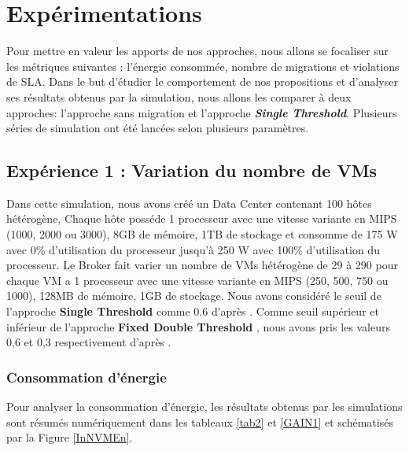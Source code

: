 \section{Expérimentations}

\begin{onehalfspace}
Pour mettre en valeur les apports de nos approches, nous allons se focaliser sur les métriques suivantes : l’énergie consommée, nombre de migrations et violations de SLA. Dans le but d’étudier le comportement de nos propositions et d’analyser ses résultats obtenus par la simulation, nous allons les comparer à deux approches: l’approche sans migration et l’approche \textit{\textbf{Single Threshold}}. Plusieurs séries de simulation ont été lancées selon plusieurs paramètres.

\subsection{Expérience 1 : Variation du nombre de VMs}
Dans cette simulation, nous avons créé un Data Center contenant 100 hôtes hétérogène, Chaque hôte posséde 1 processeur avec une vitesse variante en MIPS (1000, 2000 ou 3000), 8GB de mémoire, 1TB de stockage et consomme de 175 W avec 0\% d'utilisation du processeur jusqu'à 250 W avec 100\% d'utilisation du processeur. Le Broker fait varier un nombre de VMs hétérogène de 29 à 290 pour chaque VM a 1 processeur avec une vitesse variante en MIPS (250, 500, 750 ou 1000), 128MB de mémoire, 1GB de stockage. Nous avons considéré le seuil de l’approche \textbf{Single Threshold} comme 0.6 d'après \cite{ref43}. Comme seuil supérieur et inférieur  de l’approche \textbf{Fixed Double Threshold} , nous avons pris les valeurs 0,6 et 0,3 respectivement d'après \cite{ref43}.
\subsubsection{Consommation d’énergie}
Pour analyser la consommation d’énergie, les résultats obtenus par les simulations sont résumés numériquement dans les tableaux \ref{tab2} et \ref{GAIN1} et schématisés par la Figure \ref{InNVMEn}.\\



\end{onehalfspace}
